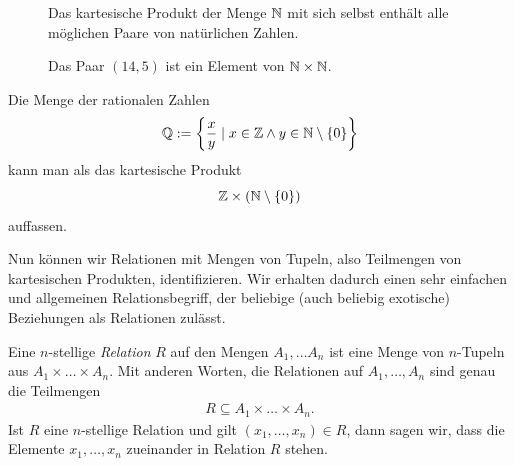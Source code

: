     \begin{figure}[h]
    \begin{bsp}
    Das kartesische Produkt der Menge $\mathbb{N}$ mit sich selbst enthält alle möglichen Paare von natürlichen Zahlen.
    \begin{center}
    \begin{framed}
    \caption*{Das Paar $(14,5)$ ist ein Element von $\mathbb{N}\times\mathbb{N}$.}
    \end{framed}
    \end{center}
    \end{bsp}
    \end{figure}

    \begin{bsp}
        Die Menge der rationalen Zahlen
        \[
        \mathbb{Q}:=\left\{\frac{x}{y}\mid x\in \mathbb{Z}\land y\in\mathbb{N}\setminus\{0\}\right\}
        \]
        kann man als das kartesische Produkt
        \[
        \mathbb{Z}\times(\mathbb{N}\setminus\{0\})
        \]
        auffassen.
    \end{bsp}

Nun können wir Relationen mit Mengen von Tupeln, also Teilmengen von kartesischen Produkten, identifizieren. Wir erhalten dadurch einen sehr einfachen und allgemeinen Relationsbegriff, der beliebige (auch beliebig exotische) Beziehungen als Relationen zulässt.

\begin{df}
Eine $n$-stellige \textit{Relation} $R$ auf den Mengen $A_1,\dots A_n$ ist eine Menge von $n$-Tupeln aus $A_1\times\dots \times A_n$. Mit anderen Worten, die Relationen auf $A_1,\dots,A_n$ sind genau die Teilmengen
\begin{align*}
R\subseteq A_1\times\dots \times A_n.
\end{align*}
Ist $R$ eine $n$-stellige Relation und gilt $(x_1,\dots,x_n)\in R$, dann sagen wir, dass die Elemente $x_1,\dots,x_n$ zueinander in Relation $R$ stehen.
\end{df}

